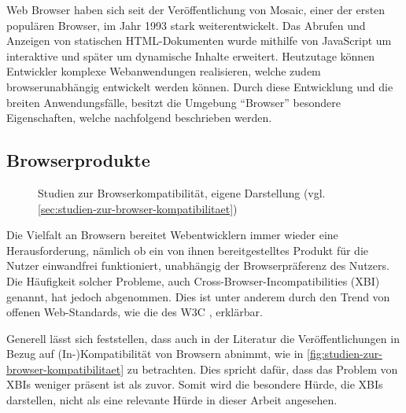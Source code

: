 Web Browser haben sich seit der Veröffentlichung von Mosaic, einer der ersten populären Browser, im Jahr 1993 stark weiterentwickelt. Das Abrufen und Anzeigen von statischen HTML-Dokumenten wurde mithilfe von JavaScript um interaktive und später um dynamische Inhalte erweitert. Heutzutage können Entwickler komplexe Webanwendungen realisieren, welche zudem browserunabhängig entwickelt werden können. Durch diese Entwicklung und die breiten Anwendungsfälle, besitzt die Umgebung \enquote{Browser} besondere Eigenschaften, welche nachfolgend beschrieben werden.

\subsection{Browserprodukte}
\label{sec:browserprodukte}

\begin{wrapfigure}[19]{r}{0.45\textwidth}
\centering
{}
\caption{Studien zur Browserkompatibilität, eigene Darstellung (vgl. \ref{sec:studien-zur-browser-kompatibilitaet})}
\label{fig:studien-zur-browser-kompatibilitaet}
\end{wrapfigure}

Die Vielfalt an Browsern bereitet Webentwicklern immer wieder eine Herausforderung, nämlich ob ein von ihnen bereitgestelltes Produkt für die Nutzer einwandfrei funktioniert, unabhängig der Browserpräferenz des Nutzers. Die Häufigkeit solcher Probleme, auch Cross-Browser-Incompatibilities (XBI) genannt, hat jedoch abgenommen. Dies ist unter anderem durch den Trend von offenen Web-Standards, wie die des W3C \cite{W3CStandards}, erklärbar.


Generell lässt sich feststellen, dass auch in der Literatur die Veröffentlichungen in Bezug auf (In-)Kompatibilität von Browsern abnimmt, wie in \autoref{fig:studien-zur-browser-kompatibilitaet} zu betrachten. Dies spricht dafür, dass das Problem von XBIs weniger präsent ist als zuvor. Somit wird die besondere Hürde, die XBIs darstellen, nicht als eine relevante Hürde in dieser Arbeit angesehen.

